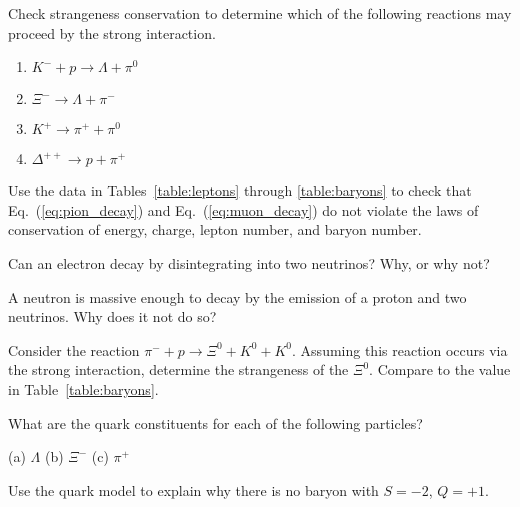 \begin{problem}
Check strangeness conservation to determine which of the
  following reactions may proceed by the strong interaction.
  \begin{enumerate}
  \item $K^- + p \to \Lambda + \pi^0$
  \item $\Xi^- \to \Lambda + \pi^-$
  \item $K^+ \to \pi^+ + \pi^0$
  \item $\Delta^{++} \to p + \pi^+$
  \end{enumerate}
\label{prob:strangeness_and_strong_force}
\end{problem}

\begin{problem}
Use the data in Tables~\ref{table:leptons} through 
  \ref{table:baryons} to check that Eq.~(\ref{eq:pion_decay}) and
  Eq.~(\ref{eq:muon_decay}) do not violate the laws of conservation of
  energy, charge, lepton number, and baryon number.
\label{prob:pion_and_muon_decay}
\end{problem}

\begin{problem}
Can an electron decay by disintegrating into two neutrinos?
  Why, or why not?
\label{prob:electron_stability}
\end{problem}

\begin{problem}
A neutron is massive enough to decay by the emission of a proton
  and two neutrinos.  Why does it not do so?
\label{prob:neutron_decay}
\end{problem}

\begin{problem}
Consider the reaction $\pi^- + p \to \Xi^0 + K^0 + K^0$.
  Assuming this reaction occurs via the strong interaction, determine
  the strangeness of the $\Xi^0$.  Compare to the value in
  Table~\ref{table:baryons}.
\label{prob:Xi0_strangeness}
\end{problem}

\begin{problem}
What are the quark constituents for each of the following
  particles?  \par  \medskip
  (a)  $\Lambda$ \qquad\qquad (b) $\Xi^-$ \qquad\qquad (c)  $\pi^+$
\label{prob:quark_constituents}
\end{problem}

\begin{problem}
Use the quark model to explain why there is no baryon with
$S = -2$, $Q = +1$.
\label{prob:quark_model}
\end{problem}

